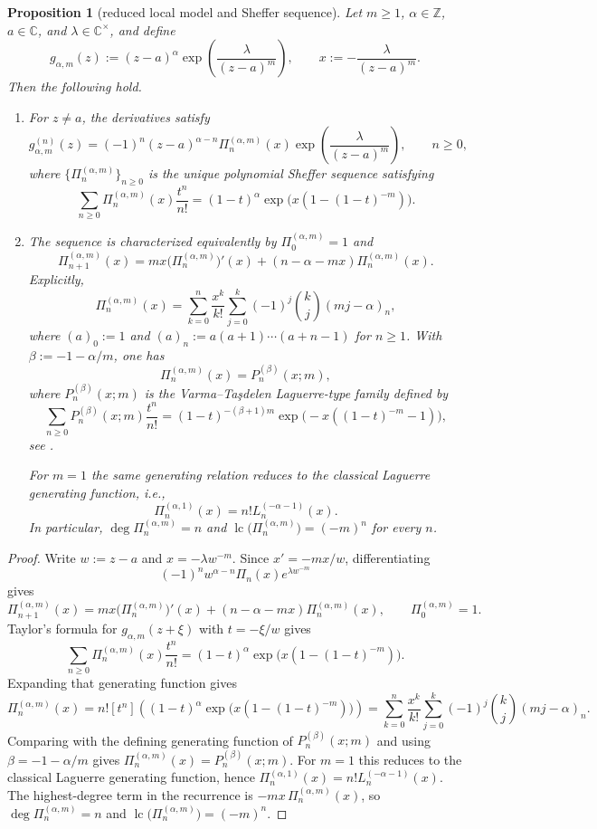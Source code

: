 \documentclass[reqno]{article}
\newtheorem{prop}[theorem]{Proposition}
\theoremstyle{definition}
\theoremstyle{remark}
\theoremstyle{plain}
\newcommand{\C}{\mathbb C}
\newcommand{\lc}{\operatorname{lc}}
\begin{document}
\begin{prop}[reduced local model and Sheffer sequence]\label{prop:micro-higher}
Let $m\ge1$, $\alpha\in\mathbb Z$, $a\in\C$, and $\lambda\in\C^\times$, and define
$$g_{\alpha,m}(z):=(z-a)^\alpha \exp\!\left(\frac{\lambda}{(z-a)^m}\right),\qquad x:=-\frac{\lambda}{(z-a)^m}.$$
Then the following hold.

\begin{enumerate}
\item For $z\ne a$, the derivatives satisfy
$$g_{\alpha,m}^{(n)}(z)=(-1)^n(z-a)^{\alpha-n}\Pi_n^{(\alpha,m)}(x)\exp\!\left(\frac{\lambda}{(z-a)^m}\right),\qquad n\ge0,$$
where $\{\Pi_n^{(\alpha,m)}\}_{n\ge0}$ is the unique polynomial Sheffer sequence satisfying 
$$\sum_{n\ge0}\Pi_n^{(\alpha,m)}(x)\frac{t^n}{n!}
=(1-t)^\alpha \exp\!\bigl(x(1-(1-t)^{-m})\bigr).$$

\item The sequence is characterized equivalently by $\Pi_0^{(\alpha,m)}=1$ and
$$\Pi_{n+1}^{(\alpha,m)}(x)=mx\bigl(\Pi_n^{(\alpha,m)}\bigr)'(x)+(n-\alpha-mx)\Pi_n^{(\alpha,m)}(x).$$
Explicitly,
$$\Pi_n^{(\alpha,m)}(x)=\sum_{k=0}^n\frac{x^k}{k!}\sum_{j=0}^k(-1)^j\binom{k}{j}(mj-\alpha)_n,$$
where $(a)_0:=1$ and $(a)_n:=a(a+1)\cdots(a+n-1)$ for $n\ge1$. With $\beta:=-1-\alpha/m$, one has
$$\Pi_n^{(\alpha,m)}(x)=P_n^{(\beta)}(x;m),$$
where $P_n^{(\beta)}(x;m)$ is the Varma--Ta\c{s}delen Laguerre-type family defined by
$$\sum_{n\ge0}P_n^{(\beta)}(x;m)\frac{t^n}{n!}
=(1-t)^{-(\beta+1)m}\exp\!\bigl(-x((1-t)^{-m}-1)\bigr),$$
see \cite[Eq.~(3)]{VT}.

For $m=1$ the same generating relation reduces to the classical Laguerre generating function, i.e., 
$$\Pi_n^{(\alpha,1)}(x)=n!L_n^{(-\alpha-1)}(x).$$ 
In particular, $\deg\Pi_n^{(\alpha,m)}=n$ and $\lc\!\bigl(\Pi_n^{(\alpha,m)}\bigr)=(-m)^n$ for every $n$.
\end{enumerate}
\end{prop}

\begin{proof}
Write $w:=z-a$ and $x=-\lambda w^{-m}$. Since $x'=-mx/w$, differentiating
$$(-1)^n w^{\alpha-n}\Pi_n(x)e^{\lambda w^{-m}}$$
gives
$$\Pi_{n+1}^{(\alpha,m)}(x)=mx\bigl(\Pi_n^{(\alpha,m)}\bigr)'(x)+(n-\alpha-mx)\Pi_n^{(\alpha,m)}(x),\qquad \Pi_0^{(\alpha,m)}=1.$$
Taylor's formula for $g_{\alpha,m}(z+\xi)$ with $t=-\xi/w$ gives
$$\sum_{n\ge0}\Pi_n^{(\alpha,m)}(x)\frac{t^n}{n!}
=(1-t)^\alpha \exp\!\bigl(x(1-(1-t)^{-m})\bigr).$$
Expanding that generating function gives
$$\Pi_n^{(\alpha,m)}(x)=n![t^n]\!\left((1-t)^\alpha \exp\!\bigl(x(1-(1-t)^{-m})\bigr)\right)
=\sum_{k=0}^n\frac{x^k}{k!}\sum_{j=0}^k(-1)^j\binom{k}{j}(mj-\alpha)_n.$$
Comparing with the defining generating function of $P_n^{(\beta)}(x;m)$ and using $\beta=-1-\alpha/m$ gives $\Pi_n^{(\alpha,m)}(x)=P_n^{(\beta)}(x;m)$. For $m=1$ this reduces to the classical Laguerre generating function, hence $\Pi_n^{(\alpha,1)}(x)=n!L_n^{(-\alpha-1)}(x)$. The highest-degree term in the recurrence is $-mx\,\Pi_n^{(\alpha,m)}(x)$, so $\deg\Pi_n^{(\alpha,m)}=n$ and $\lc\!\bigl(\Pi_n^{(\alpha,m)}\bigr)=(-m)^n$.
\end{proof}
\end{document}
